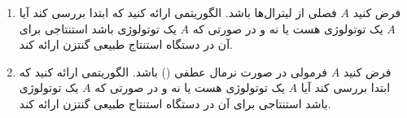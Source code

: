 \quad\begin{enumerate}
  \item
  فرض کنید $A$ فصلی از لیترال‌ها باشد. الگوریتمی ارائه کنید که ابتدا بررسی کند آیا $A$ یک توتولوژی هست یا نه و در صورتی که $A$ یک توتولوژی باشد استنتاجی برای آن در دستگاه استنتاج طبیعی گنتزن ارائه کند.
  \item
  فرض کنید $A$ فرمولی در صورت نرمال عطفی () باشد. الگوریتمی ارائه کنید که ابتدا بررسی کند آیا $A$ یک توتولوژی هست یا نه و در صورتی که $A$ یک توتولوژی باشد استنتاجی برای آن در دستگاه استنتاج طبیعی گنتزن ارائه کند.
\end{enumerate}
